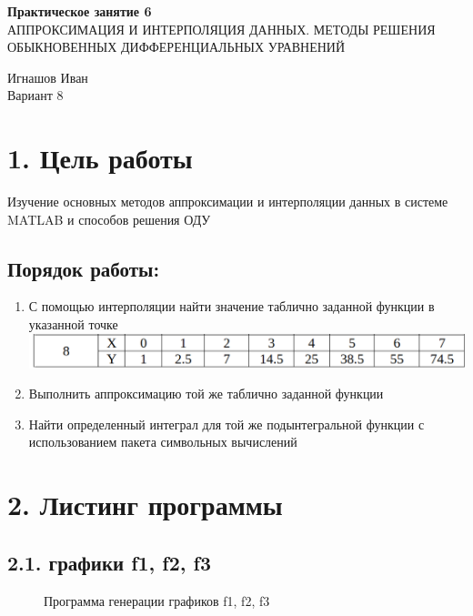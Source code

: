 \documentclass[12pt]{article}
\begin{document}
\begin{center}
	\LARGE 
	\textbf{Практическое занятие 6}\\
	АППРОКСИМАЦИЯ И ИНТЕРПОЛЯЦИЯ ДАННЫХ. МЕТОДЫ РЕШЕНИЯ ОБЫКНОВЕННЫХ ДИФФЕРЕНЦИАЛЬНЫХ УРАВНЕНИЙ\\
\end{center}

\begin{flushright}
	\large
	Игнашов Иван\\
	Вариант 8\\
\end{flushright}

\newpage

 \section*{1. Цель работы}
Изучение основных методов аппроксимации и интерполяции данных в системе MATLAB и способов решения ОДУ
\subsection*{Порядок работы:}
\begin{enumerate}
	\item С помощью интерполяции найти значение таблично заданной функции в указанной точке\\
		\includegraphics[width=0.75\linewidth]{formula.png}\\
		
	\item Выполнить аппроксимацию той же таблично заданной функции\\
	
	\item Найти определенный интеграл для той же подынтегральной функции с использованием пакета символьных вычислений\\
\end{enumerate}

\newpage
 \section*{2. Листинг программы}%
 
 \subsection*{2.1. графики f1, f2, f3}
\begin{figure}[!h]
	\centering
	\caption{Программа генерации графиков f1, f2, f3}
\end{figure}
\end{document}
